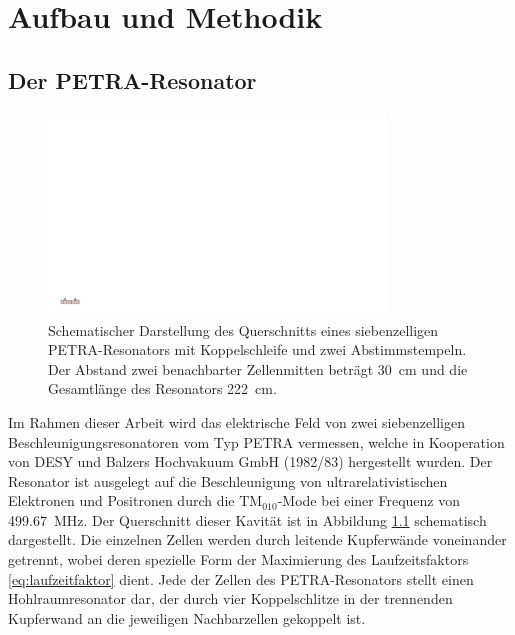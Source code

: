 \chapter{Aufbau und Methodik}
\label{sec:aufbau_und_methodik}


\section{Der PETRA-Resonator}
\begin{figure}[htb]
  \centering
  \includegraphics[width=0.8\textwidth]{./figs/cavity/cavity.pdf}
  \caption{Schematischer Darstellung des Querschnitts eines siebenzelligen PETRA-Resonators mit Koppelschleife und zwei Abstimmstempeln. Der Abstand zwei benachbarter Zellenmitten beträgt \SI{30}{\centi\metre} und die Gesamtlänge des Resonators \SI{222}{\centi\metre}.}
  \label{fig:petra_cavity}
\end{figure}
Im Rahmen dieser Arbeit wird das elektrische Feld von zwei siebenzelligen Beschleunigungsresonatoren vom Typ PETRA \cite{desy_petra} vermessen, welche in Kooperation von DESY und Balzers Hochvakuum GmbH (1982/83) hergestellt wurden.
Der Resonator ist ausgelegt auf die Beschleunigung von ultrarelativistischen Elektronen und Positronen durch die $\mathrm{TM}_{010}$-Mode bei einer Frequenz von \SI{499.67}{MHz}.
Der Querschnitt dieser Kavität ist in Abbildung \ref{fig:petra_cavity} schematisch dargestellt.
Die einzelnen Zellen werden durch leitende Kupferwände voneinander getrennt, wobei deren spezielle Form der Maximierung des Laufzeitsfaktors \eqref{eq:laufzeitfaktor} dient.
Jede der Zellen des PETRA-Resonators stellt einen Hohlraumresonator dar, der durch vier Koppelschlitze in der trennenden Kupferwand an die jeweiligen Nachbarzellen gekoppelt ist.
